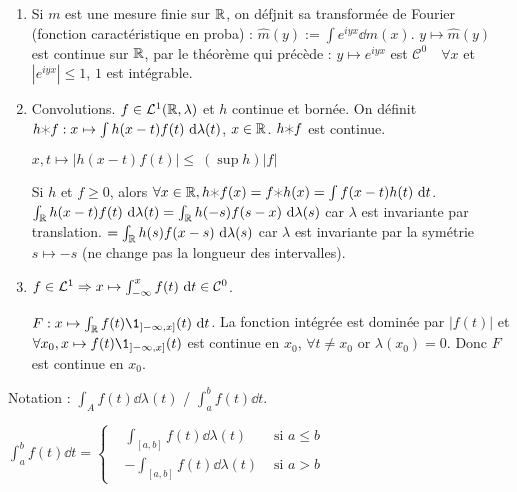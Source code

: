 \documentclass[10pt,a4paper,notitlepage ]{report}
\begin{document}
\begin{exemple}
	\begin{enumerate}
		\item Si $m$ est une mesure finie sur $\mathbb R$, on défjnit sa transformée de Fourier (fonction caractéristique en proba) : $\hat m(y) := \int e^{iyx}\dd m(x)$.
		$y\mapsto \hat m(y)$ est continue sur $\mathbb R$, par le théorème qui précède :
		$y\mapsto e^{iyx}$ est $\mathcal C^0 \quad \forall x$ et $|e^{iyx}|\le 1$, $1$ est intégrable.
		\item Convolutions. $f \in \mathcal L^1(\mathbb R,\lambda)$ et $h$ continue et bornée. On définit $h\varhexstar f : x \mapsto \int h(x-t)f(t)\dd \lambda(t)$, $x\in\mathbb R$.
		$h\varhexstar f$ est continue.
		
		$x,t\mapsto |h(x-t)f(t)| \le \ (\sup h)|f|$
		\begin{rem}
			Si $h$ et $f\ge 0$, alors $\forall x\in\R, h\varhexstar f(x) = f\varhexstar h(x) = \int f(x-t)h(t) \dd t$.
			$\int_\mathbb R h(x-t)f(t)\ \mathrm d\lambda(t) = \int_\mathbb R h(-s)f(s-x) \ \mathrm d\lambda(s)$ car $\lambda$ est invariante par translation.
			$= \int_\mathbb R h(s)f(x-s)\ \mathrm d\lambda(s)$ car $\lambda$ est invariante par la symétrie $s\mapsto -s$ (ne change pas la longueur des intervalles).
		\end{rem}
	\item $f\in\mathcal L^1 \Rightarrow x\mapsto \int_{-\infty}^x f(t) \ \mathrm d t \in \mathcal C^0$.
	\begin{demo}
		$F : x\mapsto \int _\R f(t)\1_{]-\infty,x]}(t)\dd t$. La fonction intégrée est dominée par $|f(t)|$ et $\forall x_0, x\mapsto f(t)\1_{]-\infty,x]}(t)$ est continue en $x_0$, $\forall t \neq x_0$ or $\lambda({x_0}) = 0$. Donc $F$ est continue en $x_0$.
	\end{demo}
	\end{enumerate}
\end{exemple}
\begin{rem}
	Notation : $\int_A f(t)\dd \lambda(t)$ / $\int_a^b f(t)\dd t$.
	\begin{definition}
		$\int_a^b f(t) \dd t = \left\{\begin{aligned}
			&\int_{[a,b]} f(t)\dd\lambda(t)&\text{ si } a\le b\\
			&-\int_{[a,b]}f(t)\dd \lambda(t)&\text{ si } a > b
		\end{aligned} \right.$
	\end{definition}
\end{rem}
\end{document}
